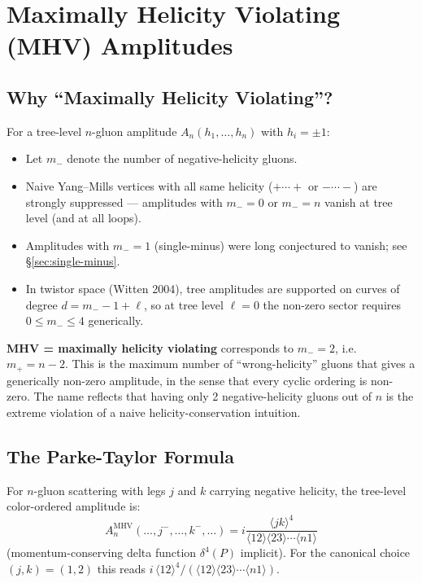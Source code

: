 
\chapter{Maximally Helicity Violating (MHV) Amplitudes}
\label{ch:mhv}

\section{Why ``Maximally Helicity Violating''?}

For a tree-level $n$-gluon amplitude $A_n(h_1,\dots,h_n)$ with $h_i=\pm 1$:
\begin{itemize}
  \item Let $m_-$ denote the number of negative-helicity gluons.
  \item Naive Yang--Mills vertices with all same helicity ($+\cdots+$ or $-\cdots-$) are strongly suppressed --- amplitudes with $m_-=0$ or $m_-=n$ vanish at tree level (and at all loops).
  \item Amplitudes with $m_-=1$ (single-minus) were long conjectured to vanish; see \S\ref{sec:single-minus}.
  \item In twistor space (Witten 2004), tree amplitudes are supported on curves of degree $d = m_- - 1 + \ell$, so at tree level $\ell=0$ the non-zero sector requires $0 \le m_- \le 4$ generically.
\end{itemize}
\textbf{MHV = maximally helicity violating} corresponds to $m_- = 2$, i.e.\ $m_+ = n-2$. This is the maximum number of ``wrong-helicity'' gluons that gives a generically non-zero amplitude, in the sense that every cyclic ordering is non-zero. The name reflects that having only 2 negative-helicity gluons out of $n$ is the extreme violation of a naive helicity-conservation intuition.

\section{The Parke-Taylor Formula}

For $n$-gluon scattering with legs $j$ and $k$ carrying negative helicity, the tree-level color-ordered amplitude is:
\begin{equation}
\boxed{A_n^{\text{MHV}}(\ldots, j^-, \ldots, k^-, \ldots) = i \frac{\langle j k \rangle^4}{\langle 12 \rangle \langle 23 \rangle \cdots \langle n1 \rangle}}
\end{equation}
(momentum-conserving delta function $\delta^4(P)$ implicit).
For the canonical choice $(j,k)=(1,2)$ this reads $i\,\langle 12\rangle^4 / (\langle 12\rangle\langle 23\rangle\cdots\langle n1\rangle)$.

